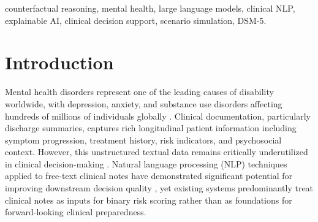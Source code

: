 \documentclass[conference]{IEEEtran}
\begin{document}
\begin{abstract}
Clinical notes on patients with mental health conditions contain rich, unstructured information that remains critically underutilized in clinical decision-making. Existing AI systems for mental health prioritize risk score prediction, leaving clinicians and psychology students unprepared for extreme adverse patient trajectories. We propose a safety-aware fine-tuned large language model (LLM) framework that acts as a second reader of mental health documentation not to predict outcomes, but to prepare clinicians and psychology students for extreme patient trajectories. The framework operates in three stages: (1) Clinical Factor Extraction extracting structured risk and protective factors from unstructured clinical notes using a DSM-5 and ICD-11 grounded schema; (2) Extreme Scenario Generation generating counterfactual narratives of extreme adverse mental health trajectories reachable from the patient's current state, targeting boundary conditions rather than probable outcomes; and (3) Causal Explainability an Explainable AI (XAI) layer providing causal pathway justifications and uncertainty estimates for each generated scenario. The system is trained on de-identified clinical notes and validated against clinician-annotated gold standards, evaluated across scenario plausibility, causal fidelity, hallucination rate, and clinician usability. To the best of our knowledge, this is the first framework to employ counterfactual simulation of extreme mental health scenarios for clinical preparedness, augmenting rather than replacing expert clinical judgment.
\end{abstract}

\begin{IEEEkeywords}
counterfactual reasoning, mental health, large language models, clinical NLP, explainable AI, clinical decision support, scenario simulation, DSM-5.
\end{IEEEkeywords}

\section{Introduction}

Mental health disorders represent one of the leading causes of disability worldwide, with depression, anxiety, and substance use disorders affecting hundreds of millions of individuals globally \cite{b1}. Clinical documentation, particularly discharge summaries, captures rich longitudinal patient information including symptom progression, treatment history, risk indicators, and psychosocial context. However, this unstructured textual data remains critically underutilized in clinical decision-making \cite{b2}. Natural language processing (NLP) techniques applied to free-text clinical notes have demonstrated significant potential for improving downstream decision quality \cite{b3}, yet existing systems predominantly treat clinical notes as inputs for binary risk scoring rather than as foundations for forward-looking clinical preparedness.
\end{document}

